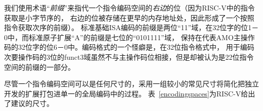 我们使用术语“{\em 前缀}”来指代一个指令编码空间的{\em 右边}的位（因为RISC-V中的指令获取是小字节序的，
右边的位被存储在更早的内存地址处，因此形成了一个按照指令获取次序的前缀）。
标准基础ISA编码的前缀是两位“11”域，在32位字的位1－0中，而标准原子扩展“A”的前缀是七位的“0101111”域，
保持在代表AMO主操作码的32位字的位6－0中。编码格式的一个怪癖是，在32位指令格式中，
用于编码次要操作码的3位的funct3域虽然不与主操作码位相接，但是却被认为是22位指令空间的前缀的一部分。

尽管一个指令编码空间可以是任何尺寸的，采用一组较小的常见尺寸将简化把独立开发的扩展打包进单一的全局编码中的过程。
表~\ref{encodingspaces}为RISC-V给出了建议的尺寸。

